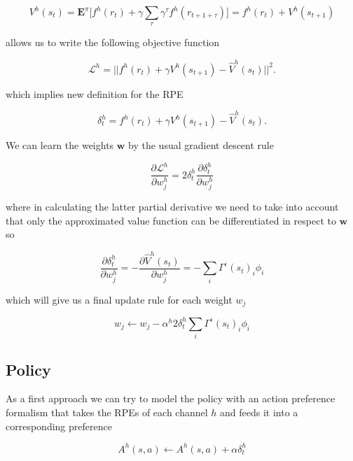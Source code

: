 \documentclass{article}
\begin{document}
\begin{equation}
  V^h(s_t) = \mathbf{E}^\pi \big[ f^h(r_{t}) + \gamma \sum_{\tau} \gamma^{\tau} f^h(r_{t+1+\tau})\big ] = f^h(r_t) + V^h(s_{t+1})
\end{equation}

allows us to write the following objective function

\begin{equation}
  \mathcal{L}^h = ||f^h(r_t) + \gamma V^h(s_{t+1}) - \hat{V}^h(s_t)||^2.
\end{equation}

which implies new definition for the RPE 

\begin{equation}
  \delta^h_t = f^h(r_t) + \gamma V^h(s_{t+1})-\hat{V}^h(s_t).
\end{equation}

We can learn the weights $\mathbf{w}$ by the usual gradient descent rule

\begin{equation}
  \frac{\partial \mathcal{L}^h}{\partial w^h_j} = 2 \delta^h_t\frac{\partial \delta^h_t}{\partial w^h_j}
\end{equation}

where in calculating the latter partial derivative we need to take into account that only the approximated 
value function can be differentiated in respect to $\mathbf{w}$ so

\begin{equation}
  \frac{\partial \delta^h_t}{\partial w^h_j} = - \frac{\partial \hat{V}^h(s_{t})}{\partial w^h_j} =   -\sum_{i} \Gamma^\epsilon(s_t)_i\phi_i
\end{equation}

which will give us a final update rule for each weight $w_j$ 

\begin{equation}
  w_j \leftarrow w_j - \alpha^h 2 \delta^h_t\sum_{i}\Gamma^\epsilon(s_t)_i\phi_i
\end{equation}

\subsection{Policy}

As a first approach we can try to model the policy with an action preference formalism that takes the RPEs of each channel $h$
and feeds it into a corresponding preference 

\begin{equation}
  A^h(s,a) \leftarrow A^h(s,a) + \alpha \delta^h_t
\end{equation}
\end{document}
